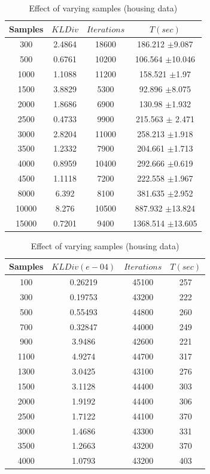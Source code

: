 \documentclass[runningheads,a4paper]{llncs}
\begin{document}
\begin{table}[htdp]
\parbox{.43\linewidth}{
\centering
\begin{tabular}{| c | c | c | c |}
\hline
Samples & $KL Div$ & $Iterations$& $T(sec)$ \\
\hline
300 & 2.4864 & 18600 & 186.212 $\pm$9.087  \\
500 & 0.6761 & 10200 & 106.564 $\pm$10.046 \\
1000 & 1.1088 & 11200 & 158.521 $\pm$1.97  \\
1500 & 3.8829 & 5300 & 92.896 $\pm$8.075  \\
2000 & 1.8686 & 6900 & 130.98 $\pm$1.932 \\
2500 & 0.4733 & 9900 & 215.563 $\pm$ 2.471 \\
3000 & 2.8204 & 11000 & 258.213 $\pm1.918$ \\
3500 & 1.2332 & 7900 & 204.661 $\pm$1.713 \\
4000 & 0.8959 & 10400 & 292.666 $\pm$0.619 \\
4500 & 1.1118 & 7200 & 222.558 $\pm$1.967 \\
8000 & 6.392 & 8100 & 381.635 $\pm$2.952  \\
10000 & 8.276 & 10500 & 887.932 $\pm$13.824  \\
15000 & 0.7201 & 9400 & 1368.514 $\pm$13.605  \\
\hline
\end{tabular}
\caption{Effect of varying samples (REDD)}
\label{table:sample1}}
\hfill
\parbox{.43\linewidth}{
\centering
\begin{tabular}{| c | c | c | c |}
\hline
Samples & $KL Div(e-04)$  & $Iterations$ & $T(sec)$\\
\hline
100 & 0.26219 & 45100 & 257  \\
300 & 0.19753 & 43200 & 222 \\
500 & 0.55493 & 44800 & 260  \\
700 & 0.32847 & 44000 & 249 \\
900 & 3.9486 & 42600 & 221  \\
1100 & 4.9274 & 44700 & 317  \\
1300 & 3.0425 & 43100 & 276 \\
1500 &  3.1128 & 44400 & 303 \\
2000 & 1.9192 & 44400 & 306 \\
2500 & 1.7122 & 44100 & 370 \\
3000 & 1.4686 & 43300 & 331 \\
3500 & 1.2663 & 43200 & 370  \\
4000 & 1.0793 & 43200 & 403  \\
\hline
\end{tabular}
\caption{Effect of varying samples (housing data)}
\label{table:sample2}}
\end{table}
\end{document}

